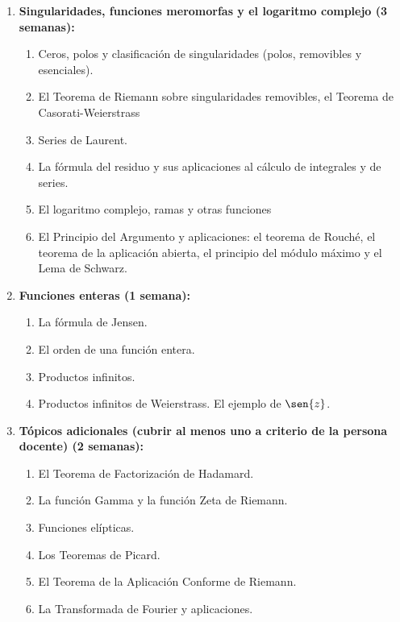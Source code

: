 \begin{refsection}
\begin{enumerate}
\item \textbf{Singularidades, funciones meromorfas y el logaritmo complejo (3 semanas):} 
\begin{enumerate}
    \item Ceros, polos y clasificación de singularidades (polos, removibles y esenciales).
    \item El Teorema de Riemann  sobre singularidades removibles, el Teorema de Casorati-Weierstrass
    \item Series de Laurent.
    \item La fórmula del residuo y sus aplicaciones al cálculo de integrales y de series.
    \item El logaritmo complejo, ramas y otras funciones 
    \item El Principio del Argumento y aplicaciones: el teorema de Rouché, el teorema de la aplicación abierta, el principio del módulo máximo y el Lema de Schwarz.
\end{enumerate}

\item \textbf{Funciones enteras (1 semana):} 
\begin{enumerate}
    \item La fórmula de Jensen.
    \item El orden de una función entera.
    \item Productos infinitos.
    \item Productos infinitos de Weierstrass. El ejemplo de $\sen{z}$.
\end{enumerate}


\item \textbf{Tópicos adicionales (cubrir al menos uno a criterio de la persona docente) (2 semanas):} 
\begin{enumerate}
    \item El Teorema de Factorización de Hadamard.
    \item La función Gamma y la función Zeta de Riemann.
    \item Funciones elípticas.
    \item Los Teoremas de Picard.
    \item El Teorema de la Aplicación Conforme de Riemann.
    \item La Transformada de Fourier y aplicaciones.
\end{enumerate}


\end{enumerate}
\end{refsection}

